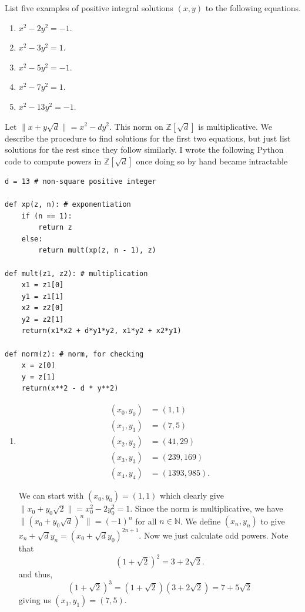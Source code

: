 \documentclass[12 pt, letterpaper]{hmcpset}
\begin{document}
\begin{problem}[1]
	List five examples of positive integral solutions $(x, y)$ to the following equations.
	\begin{enumerate}
		\item $x^{2} - 2y^{2} = -1$.
		\item $x^{2} - 3y^{2} = 1$.
		\item $x^{2} - 5 y^{2} = -1$.
		\item $x^{2} - 7 y^{2} = 1$.
		\item $x^{2} - 13 y^{2} = -1$.
	\end{enumerate}
\end{problem}

\begin{solution}
	Let $\lVert x + y \sqrt{d} \rVert = x^{2} - d y^{2}$. This norm on $\mathbb{Z}[\sqrt{d}]$ is multiplicative. We describe the procedure to find solutions for the first two equations, but just list solutions for the rest since they follow similarly. I wrote the following Python code to compute powers in $\mathbb{Z}[\sqrt{d}]$ once doing so by hand became intractable
	\begin{verbatim}
d = 13 # non-square positive integer

def xp(z, n): # exponentiation
    if (n == 1):
        return z
    else:
        return mult(xp(z, n - 1), z)

def mult(z1, z2): # multiplication
    x1 = z1[0]
    y1 = z1[1]
    x2 = z2[0]
    y2 = z2[1]
    return(x1*x2 + d*y1*y2, x1*y2 + x2*y1)

def norm(z): # norm, for checking
    x = z[0]
    y = z[1]
    return(x**2 - d * y**2)	
	\end{verbatim}
	\begin{enumerate}
		\item
			\[
				\boxed{
					\begin{split}
						(x_{0}, y_{0}) & = (1, 1) \\
						(x_{1}, y_{1}) & = (7, 5) \\
						(x_{2}, y_{2}) & = (41, 29) \\
						(x_{3}, y_{3}) & = (239, 169) \\
						(x_{4}, y_{4}) & = (1393, 985).
					\end{split}
				}
			\]

			We can start with $(x_{0}, y_{0}) = (1, 1)$ which clearly give $\lVert x_{0} + y_{0} \sqrt{2} \rVert = x_{0}^{2} - 2 y_{0}^{2} = 1$. Since the norm is multiplicative, we have $\lVert (x_{0} + y_{0} \sqrt{d})^{n} \rVert = (-1)^{n}$ for all $n \in \mathbb{N}$. We define $(x_{n}, y_{n})$ to give $x_{n} + \sqrt{d} y_{n} = (x_{0} + \sqrt{d} y_{0})^{2n + 1}$. Now we just calculate odd powers. Note that
			\[
				(1 + \sqrt{2})^{2} = 3 + 2 \sqrt{2}.
			\]
			and thus,
			\[
				(1 + \sqrt{2})^{3} = (1 + \sqrt{2})(3 + 2 \sqrt{2}) = 7 + 5 \sqrt{2}
			\]
			giving us $(x_{1}, y_{1}) = (7, 5)$.


\end{enumerate}
\end{solution}
\end{document}
